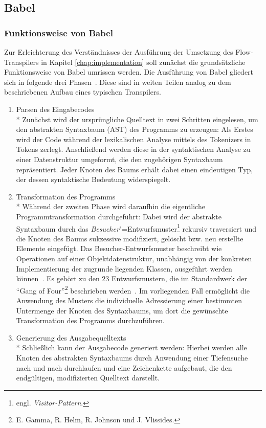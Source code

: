 \subsection{Babel}
\label{sec:babel}

\subsubsection{Funktionsweise von Babel}

Zur Erleichterung des Verständnisses der Ausführung der Umsetzung des Flow-Transpilers in Kapitel \ref{chap:implementation} soll zunächst die grundsätzliche Funktionsweise von Babel umrissen werden. Die Ausführung von Babel gliedert sich in folgende drei Phasen~\autocite{BABEL:HANDBOOK}. Diese sind in weiten Teilen analog zu dem beschriebenen Aufbau eines typischen Transpilers.

\begin{enumerate}
  \item {\libertineSB Parsen des Eingabecodes}\\*
    Zunächst wird der ursprüngliche Quelltext in zwei Schritten eingelesen, um den abstrakten Syntaxbaum (AST) des Programms zu erzeugen: Als Erstes wird der Code während der lexikalischen Analyse mittels des Tokenizers in Tokens zerlegt. Anschließend werden diese in der syntaktischen Analyse zu einer Datenstruktur umgeformt, die den zugehörigen Syntaxbaum repräsentiert. Jeder Knoten des Baums erhält dabei einen eindeutigen Typ, der dessen syntaktische Bedeutung widerspiegelt.
    \\

  \item {\libertineSB Transformation des Programms}\\*
    Während der zweiten Phase wird daraufhin die eigentliche Programmtransformation durchgeführt: Dabei wird der abstrakte Syntaxbaum durch das \emph{Besucher}"=Entwurfsmuster\footnote{engl. \textit{Visitor-Pattern}.} rekursiv traversiert und die Knoten des Baums sukzessive modifiziert, gelöscht bzw. neu erstellte Elemente eingefügt. Das Besucher-Entwurfsmuster beschreibt wie Operationen auf einer Objektdatenstruktur, unabhängig von der konkreten Implementierung der zugrunde liegenden Klassen, ausgeführt werden können~\autocite[634\psq]{FREEMAN:2004}. Es gehört zu den 23 Entwurfsmustern, die im Standardwerk  der \enquote{Gang of Four}\footnote{E. Gamma, R. Helm, R. Johnson und J. Vlissides.} beschrieben werden~\autocite[306\psqq]{GAMMA:1994}. Im vorliegenden Fall ermöglicht die Anwendung des Musters die individuelle Adressierung einer bestimmten Untermenge der Knoten des Syntaxbaums, um dort die gewünschte Transformation des Programms durchzuführen.
    \\

  \item {\libertineSB Generierung des Ausgabequelltexts}\\*
    Schließlich kann der Ausgabecode generiert werden: Hierbei werden alle Knoten des abstrakten Syntaxbaums durch Anwendung einer Tiefensuche nach und nach durchlaufen und eine Zeichenkette aufgebaut, die den endgültigen, modifizierten Quelltext darstellt.
\end{enumerate}

